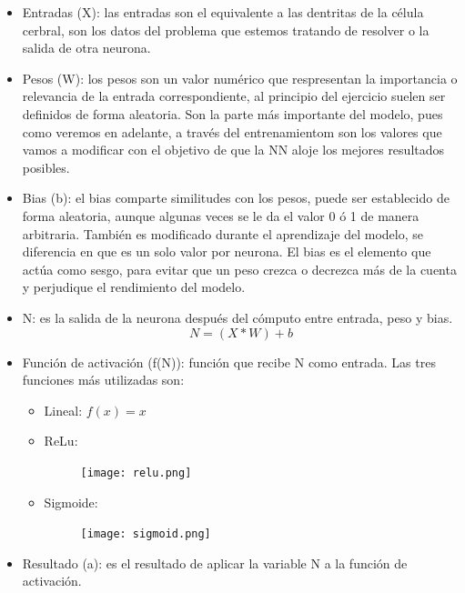 \documentclass[a4paper,10pt]{article}
\begin{document}
\begin{itemize}
    \item Entradas (X): las entradas son el equivalente a las dentritas de la célula cerbral, son los datos del problema que estemos tratando de resolver o la salida de otra neurona.
    \item Pesos (W): los pesos son un valor numérico que respresentan la importancia o relevancia de la entrada correspondiente, al principio del ejercicio suelen ser definidos de forma aleatoria. Son la parte más importante del modelo, pues como veremos en adelante, a través del entrenamientom son los valores que vamos a modificar con el objetivo de que la NN aloje los mejores resultados posibles.
    \item Bias (b): el bias comparte similitudes con los pesos, puede ser establecido de forma aleatoria, aunque algunas veces se le da el valor 0 ó 1 de manera arbitraria. También es modificado durante el aprendizaje del modelo, se diferencia en que es un solo valor por neurona. El bias es el elemento que actúa como sesgo, para evitar que un peso crezca o decrezca más de la cuenta y perjudique el rendimiento del modelo.
    \item N: es la salida de la neurona después del cómputo entre entrada, peso y bias.\\                                           \[N=(X*W)+b\]
    \item Función de activación (f(N)): función que recibe N como entrada. Las tres funciones más utilizadas son:
    \begin{itemize}
    \item Lineal: $f(x)=x$ 
    \item ReLu: 		\begin{figure}[H]
				\centering
				\texttt{[image: relu.png]}
				\end{figure}
    \item Sigmoide: 	\begin{figure}[H]
				\centering
				\texttt{[image: sigmoid.png]}
				\end{figure}
	
    \end{itemize}
    \item Resultado (a): es el resultado de aplicar la variable N a la función de activación.
        
\end{itemize}
\end{document}
